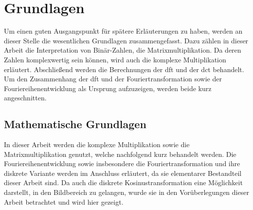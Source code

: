 



 
 
 
 \tableofcontents
 
 
 
 
 
 
 
 \chapter{Grundlagen}
 Um einen guten Ausgangspunkt für spätere Erläuterungen zu haben, werden an dieser Stelle die wesentlichen Grundlagen zusammengefasst.
 Dazu zählen in dieser Arbeit die Interpretation von Binär-Zahlen, die Matrixmultiplikation. Da deren Zahlen komplexwertig sein können,
 wird auch die komplexe Multiplikation erläutert. Abschließend werden die Berechnungen der 
 \gls{dft} und der 
 \gls{dct} behandelt. Um den Zusammenhang der \gls{dft} und der Fouriertransformation sowie der Fouriereihenentwicklung als Ursprung aufzuzeigen,
 werden beide kurz angeschnitten.
 
 
 \section{Mathematische Grundlagen}
 In dieser Arbeit werden die komplexe Multiplikation sowie die Matrixmultiplikation genutzt, welche nachfolgend kurz behandelt werden.
 Die Fouriereihenentwicklung sowie insbesondere die Fouriertransformation und ihre diskrete Variante werden im Anschluss erläutert, da
 sie elementarer Bestandteil dieser Arbeit sind.
 Da auch die diskrete Kosinustransformation eine Möglichkeit darstellt, in den Bildbereich zu gelangen, wurde sie in den 
 Vorüberlegungen dieser Arbeit betrachtet und wird hier gezeigt. 
 
 
 
 
  
 
 
  
 
